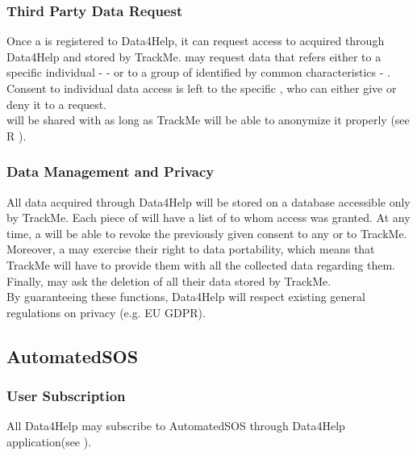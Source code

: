 \documentclass[../../rasd.tex]{subfiles}
\begin{document}
				\subsubsection{Third Party Data Request}
				Once a  is registered to Data4Help, it can request access to  acquired through Data4Help and stored by TrackMe.  may request data that refers either to a specific individual -  - or to a group of  identified by common characteristics - .\\
				Consent to individual data access is left to the specific , who can either give or deny it to a  request.\\
				 will be shared with  as long as TrackMe will be able to anonymize it properly (see R ).

				\subsubsection{Data Management and Privacy}
				All data acquired through Data4Help will be stored on a database accessible only by TrackMe. Each piece of  will have a list of  to whom access was granted. At any time, a  will be able to revoke the previously given consent to any  or to TrackMe. Moreover, a  may exercise their right to data portability, which means that TrackMe will have to provide them with all the collected data regarding them. Finally,  may ask the deletion of all their data stored by TrackMe. \\
				By guaranteeing these functions, Data4Help will respect existing general regulations on privacy (e.g. EU GDPR).
			
			\subsection{AutomatedSOS}
				
				\subsubsection{User Subscription}
				All Data4Help  may subscribe to AutomatedSOS through Data4Help application(see ).
				
\end{document}
